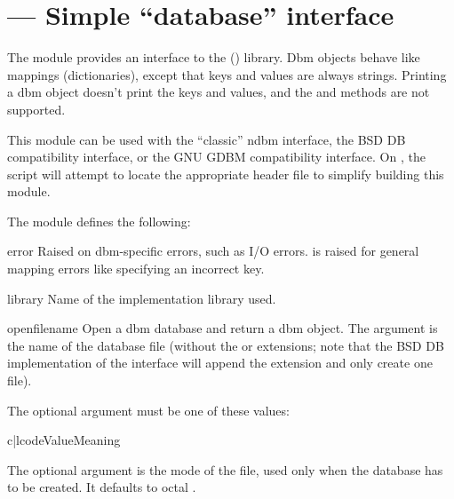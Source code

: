 \section{ ---
         Simple ``database'' interface}



The  module provides an interface to the \UNIX{}
() library.  Dbm objects behave like mappings
(dictionaries), except that keys and values are always strings.
Printing a dbm object doesn't print the keys and values, and the
 and  methods are not supported.

This module can be used with the ``classic'' ndbm interface, the BSD
DB compatibility interface, or the GNU GDBM compatibility interface.
On \UNIX, the  script will attempt to locate the
appropriate header file to simplify building this module.

The module defines the following:

\begin{excdesc}{error}
Raised on dbm-specific errors, such as I/O errors.
 is raised for general mapping errors like
specifying an incorrect key.
\end{excdesc}

\begin{datadesc}{library}
Name of the  implementation library used.
\end{datadesc}

\begin{funcdesc}{open}{filename}
Open a dbm database and return a dbm object.  The 
argument is the name of the database file (without the  or
 extensions; note that the BSD DB implementation of the
interface will append the extension  and only create one
file).

The optional  argument must be one of these values:

\begin{tableii}{c|l}{code}{Value}{Meaning}
\end{tableii}

The optional  argument is the \UNIX{} mode of the file, used
only when the database has to be created.  It defaults to octal
.
\end{funcdesc}


\begin{seealso}
\end{seealso}
